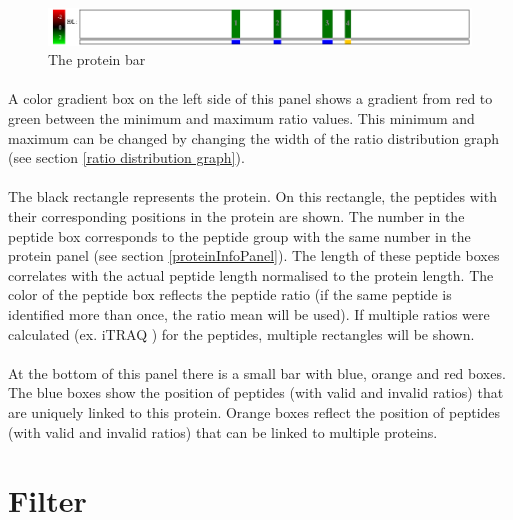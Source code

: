 \documentclass[11pt,a4paper,oneside,notitlepage]{book}
\begin{document}
\begin{figure}[H]
\begin{center}
\includegraphics{proteinBar.png}
\caption{The protein bar}
\label{barGui}
\end{center}
\end{figure}

\paragraph{}A color gradient box on the left side of this panel shows a gradient from red to green between the minimum and maximum ratio values. This minimum and maximum can be changed by changing the width of the ratio distribution graph (see section \ref{ratio distribution graph}).

\paragraph{}The black rectangle represents the protein. On this rectangle, the peptides with their corresponding positions in the protein are shown. The number in the peptide box corresponds to the peptide group with the same number in the protein panel (see section \ref{proteinInfoPanel}). The length of these peptide boxes correlates with the actual peptide length normalised to the protein length. The color of the peptide box reflects the peptide ratio (if the same peptide is identified more than once, the ratio mean will be used). If multiple ratios were calculated (ex. iTRAQ \textrademark) for the peptides, multiple rectangles will be shown.

\paragraph{}At the bottom of this panel there is a small bar with blue, orange and red boxes. The blue boxes show the position of peptides (with valid and invalid ratios) that are uniquely linked to this protein. Orange boxes reflect the position of peptides (with valid and invalid ratios) that can be linked to multiple proteins.

\section{Filter}\label{filter}
\end{document}
